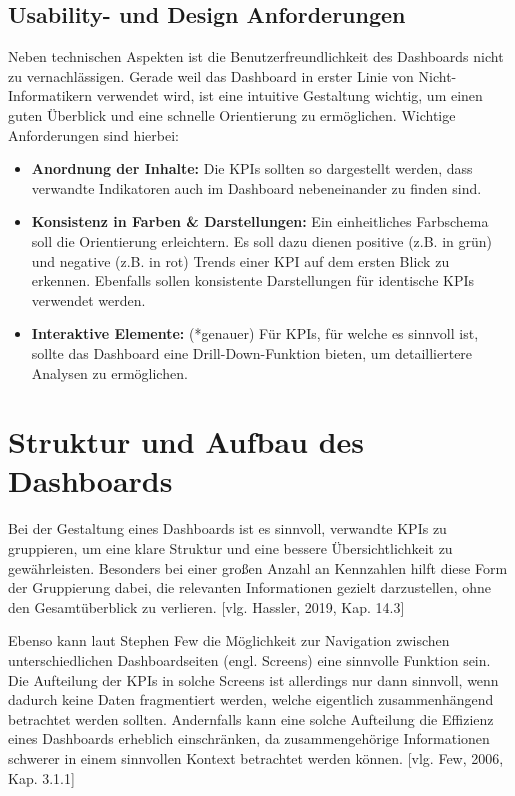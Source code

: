\subsection{Usability- und Design Anforderungen}
\label{sssec:usability}
Neben technischen Aspekten ist die Benutzerfreundlichkeit des Dashboards nicht zu vernachlässigen. Gerade weil das Dashboard in erster Linie von Nicht-Informatikern verwendet wird, ist eine intuitive Gestaltung wichtig, um einen guten Überblick und eine schnelle Orientierung zu ermöglichen. Wichtige Anforderungen sind hierbei:
\begin{itemize}
    \item \textbf{Anordnung der Inhalte:} Die KPIs sollten so dargestellt werden, dass verwandte Indikatoren auch im Dashboard nebeneinander zu finden sind.
    \item \textbf{Konsistenz in Farben \& Darstellungen:} Ein einheitliches Farbschema soll die Orientierung erleichtern. Es soll dazu dienen positive (z.B. in grün) und negative (z.B. in rot) Trends einer KPI auf dem ersten Blick zu erkennen. Ebenfalls sollen konsistente Darstellungen für identische KPIs verwendet werden.
    \item \textbf{Interaktive Elemente:} (*genauer) Für KPIs, für welche es sinnvoll ist, sollte das Dashboard eine Drill-Down-Funktion bieten, um detailliertere Analysen zu ermöglichen.
\end{itemize}

\section{Struktur und Aufbau des Dashboards}
Bei der Gestaltung eines Dashboards ist es sinnvoll, verwandte KPIs zu gruppieren, um eine klare Struktur und eine bessere Übersichtlichkeit zu gewährleisten. Besonders bei einer großen Anzahl an Kennzahlen hilft diese Form der Gruppierung dabei, die relevanten Informationen gezielt darzustellen, ohne den Gesamtüberblick zu verlieren. [vlg. Hassler, 2019, Kap. 14.3]

Ebenso kann laut Stephen Few die Möglichkeit zur Navigation zwischen unterschiedlichen Dashboardseiten (engl. Screens) eine sinnvolle Funktion sein. Die Aufteilung der KPIs in solche Screens ist allerdings nur dann sinnvoll, wenn dadurch keine Daten fragmentiert werden, welche eigentlich zusammenhängend betrachtet werden sollten. Andernfalls kann eine solche Aufteilung die Effizienz eines Dashboards erheblich einschränken, da zusammengehörige Informationen schwerer in einem sinnvollen Kontext betrachtet werden können. [vlg. Few, 2006, Kap. 3.1.1]


